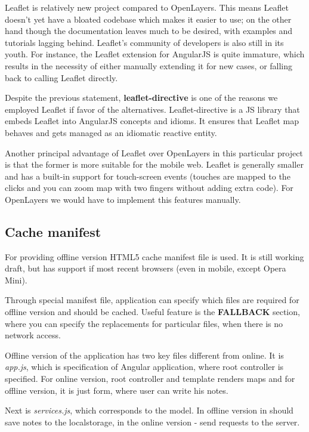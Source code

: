 \documentclass[12pt,a4paper]{article}
\begin{document}
Leaflet is relatively new project compared to OpenLayers. This means
Leaflet doesn't yet have a bloated codebase which makes it easier to
use; on the other hand though the documentation leaves much to be
desired, with examples and tutorials lagging behind. Leaflet's
community of developers is also still in its youth. For instance, the
Leaflet extension for AngularJS is quite immature, which results in
the necessity of either manually extending it for new cases, or
falling back to calling Leaflet directly.

Despite the previous statement, \textbf{leaflet-directive} is one of
the reasons we employed Leaflet if favor of the alternatives.
Leaflet-directive is a JS library that embeds Leaflet into AngularJS
concepts and idioms. It ensures that Leaflet map behaves and gets
managed as an idiomatic reactive entity.

Another principal advantage of Leaflet over OpenLayers in this
particular project is that the former is more suitable for the mobile
web. Leaflet is generally smaller and has a built-in support for
touch-screen events (touches are mapped to the clicks and you can zoom
map with two fingers without adding extra code). For OpenLayers we
would have to implement this features manually.

\subsection{Cache manifest}
For providing offline version HTML5 cache manifest file is used. It is still working
draft, but has support if most recent browsers (even in mobile, except Opera Mini).

Through special manifest file, application can specify which files are required for
offline version and should be cached. Useful feature is the \textbf{FALLBACK} section,
where you can specify the replacements for particular files, when there is no network
access.

Offline version of the application has two key files different from online.
It is \textit{app.js}, which is specification of Angular application, where root
controller is specified. For online version, root controller and template renders maps
and for offline version, it is just form, where user can write his notes.

Next is \textit{services.js}, which corresponds to the model. In offline version
in should save notes to the localstorage, in the online version - send requests
to the server.
\end{document}
